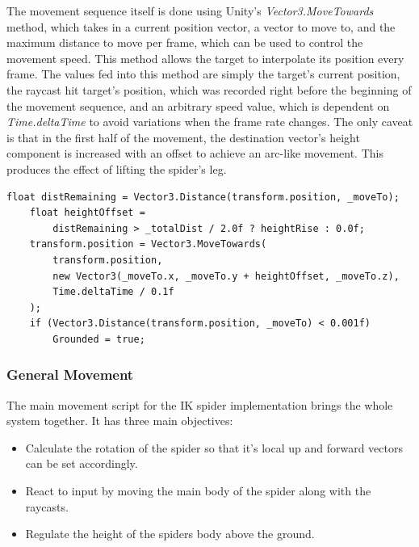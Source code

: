 The movement sequence itself is done using Unity's \textit{Vector3.MoveTowards}
method, which takes in a current position vector, a vector to move to, and the
maximum distance to move per frame, which can be used to control the movement
speed. This method allows the target to interpolate its position every frame.
The values fed into this method are simply the target's current position, the
raycast hit target's position, which was recorded right before the beginning of
the movement sequence, and an arbitrary speed value, which is dependent on
\textit{Time.deltaTime} to avoid variations when the frame rate changes. The
only caveat is that in the first half of the movement, the destination vector's
height component is increased with an offset to achieve an arc-like movement.
This produces the effect of lifting the spider's leg.

\begin{lstlisting}[basicstyle=\footnotesize, numbers=none,frame=single,
caption={Execution logic for the legs' movement sequence},captionpos=b,
label=target_move, language={[Sharp]c}]
    float distRemaining = Vector3.Distance(transform.position, _moveTo);
    float heightOffset =
        distRemaining > _totalDist / 2.0f ? heightRise : 0.0f;
    transform.position = Vector3.MoveTowards(
        transform.position,
        new Vector3(_moveTo.x, _moveTo.y + heightOffset, _moveTo.z),
        Time.deltaTime / 0.1f
    );
    if (Vector3.Distance(transform.position, _moveTo) < 0.001f)
        Grounded = true;
\end{lstlisting}

\subsubsection{General Movement}
The main movement script for the IK spider implementation brings the whole
system together. It has three main objectives:

\begin{itemize}

    \item Calculate the rotation of the spider so that it's local up and forward
        vectors can be set accordingly.

    \item React to input by moving the main body of the spider along with the
        raycasts.

    \item Regulate the height of the spiders body above the ground.

\end{itemize}

